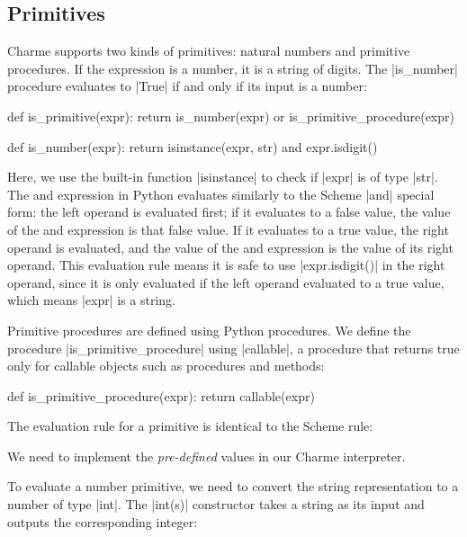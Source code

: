 \subsection{Primitives}

Charme supports two kinds of primitives: natural numbers and primitive procedures.  If the expression is a number, it is a string of digits.  The \pycode|is_number| procedure evaluates to \pycode|True| if and only if its input is a number:

\begin{pythoncode}
def is_primitive(expr):
    return is_number(expr) or is_primitive_procedure(expr)

def is_number(expr):
    return isinstance(expr, str) and expr.isdigit()
\end{pythoncode}
Here, we use the built-in function \pycode|isinstance| to check if \pycode|expr| is of type \pycode|str|.  The and expression in Python evaluates similarly to the Scheme \pycode|and| special form: the left operand is evaluated first; if it evaluates to a false value, the value of the and expression is that false value.  If it evaluates to a true value, the right operand is evaluated, and the value of the and expression is the value of its right operand.  This evaluation rule means it is safe to use \pycode|expr.isdigit()| in the right operand, since it is only evaluated if the left operand evaluated to a true value, which means \pycode|expr| is a string.  

Primitive procedures are defined using Python procedures.  We define the procedure \pycode|is_primitive_procedure| using \pycode|callable|, a procedure that returns true only for callable objects such as procedures and methods:
\begin{pythoncode}
def is_primitive_procedure(expr):
    return callable(expr)
\end{pythoncode}

The evaluation rule for a primitive is identical to the Scheme rule:


We need to implement the \emph{pre-defined} values in our Charme interpreter.

To evaluate a number primitive, we need to convert the string representation to a number of type \pycode|int|.  The \pycode|int(s)| constructor takes a string as its input and outputs the corresponding integer:

